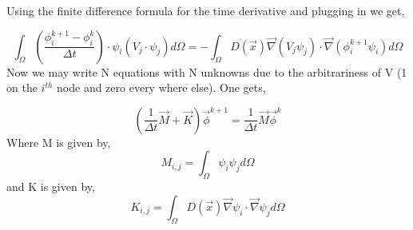 \documentclass{article}
\begin{document}
Using the finite difference formula for the time derivative and plugging in we get,

 \begin{equation} 
\int_{\Omega} \left(\frac{\phi_{i}^{k+1}-\phi_{i}^{k}}{\Delta t}\right)\cdot \psi_{i} (V_{j}\cdot \psi_{j })d\Omega = -\int_{\Omega}D(\vec{x})\vec{\nabla}(V_{j}\psi_{j}) \cdot\vec{\nabla} (\phi_{i}^{k+1}\psi_{i}) d\Omega
\end{equation}
Now we may write N equations with N unknowns due to the arbitrariness of V (1 on the $i^{th}$ node and zero every where else). One gets,

\begin{equation}
\left(\frac{1}{\Delta t}\vec{M}+\vec{K}\right)\vec{\phi}^{k+1}=\frac{1}{\Delta t}\vec{M}\vec{\phi}^{k}
\end{equation}
Where M is given by,
\begin{equation}
M_{i,j}=\int_{\Omega}\psi_{i}\psi_{j}d\Omega
\end{equation}
and K is given by,
\begin{equation}
K_{i,j}=\int_{\Omega}D(\vec{x})\vec{\nabla}\psi_{i}\cdot \vec{\nabla}\psi_{j}d\Omega
\end{equation}
\end{document}
